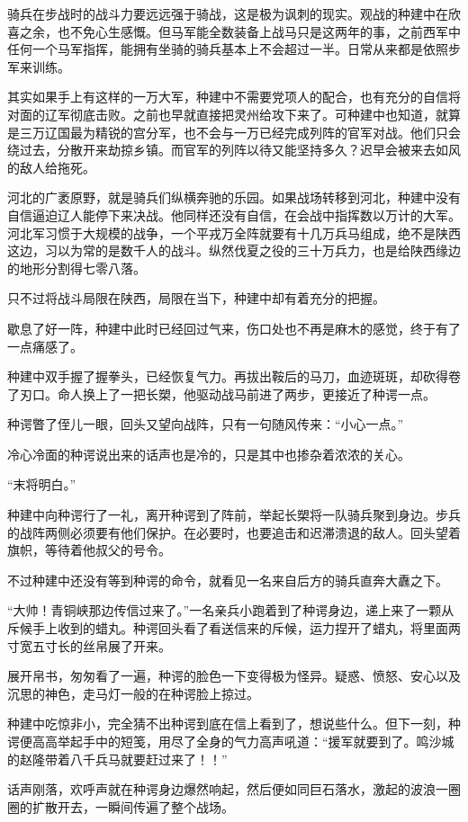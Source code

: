 骑兵在步战时的战斗力要远远强于骑战，这是极为讽刺的现实。观战的种建中在欣喜之余，也不免心生感慨。但马军能全数装备上战马只是这两年的事，之前西军中任何一个马军指挥，能拥有坐骑的骑兵基本上不会超过一半。日常从来都是依照步军来训练。

其实如果手上有这样的一万大军，种建中不需要党项人的配合，也有充分的自信将对面的辽军彻底击败。之前也早就直接把灵州给攻下来了。可种建中也知道，就算是三万辽国最为精锐的宫分军，也不会与一万已经完成列阵的官军对战。他们只会绕过去，分散开来劫掠乡镇。而官军的列阵以待又能坚持多久？迟早会被来去如风的敌人给拖死。

河北的广袤原野，就是骑兵们纵横奔驰的乐园。如果战场转移到河北，种建中没有自信逼迫辽人能停下来决战。他同样还没有自信，在会战中指挥数以万计的大军。河北军习惯于大规模的战争，一个平戎万全阵就要有十几万兵马组成，绝不是陕西这边，习以为常的是数千人的战斗。纵然伐夏之役的三十万兵力，也是给陕西缘边的地形分割得七零八落。

只不过将战斗局限在陕西，局限在当下，种建中却有着充分的把握。

歇息了好一阵，种建中此时已经回过气来，伤口处也不再是麻木的感觉，终于有了一点痛感了。

种建中双手握了握拳头，已经恢复气力。再拔出鞍后的马刀，血迹斑斑，却砍得卷了刃口。命人换上了一把长槊，他驱动战马前进了两步，更接近了种谔一点。

种谔瞥了侄儿一眼，回头又望向战阵，只有一句随风传来：“小心一点。”

冷心冷面的种谔说出来的话声也是冷的，只是其中也掺杂着浓浓的关心。

“末将明白。”

种建中向种谔行了一礼，离开种谔到了阵前，举起长槊将一队骑兵聚到身边。步兵的战阵两侧必须要有他们保护。在必要时，也要追击和迟滞溃退的敌人。回头望着旗帜，等待着他叔父的号令。

不过种建中还没有等到种谔的命令，就看见一名来自后方的骑兵直奔大纛之下。

“大帅！青铜峡那边传信过来了。”一名亲兵小跑着到了种谔身边，递上来了一颗从斥候手上收到的蜡丸。种谔回头看了看送信来的斥候，运力捏开了蜡丸，将里面两寸宽五寸长的丝帛展了开来。

展开帛书，匆匆看了一遍，种谔的脸色一下变得极为怪异。疑惑、愤怒、安心以及沉思的神色，走马灯一般的在种谔脸上掠过。

种建中吃惊非小，完全猜不出种谔到底在信上看到了，想说些什么。但下一刻，种谔便高高举起手中的短笺，用尽了全身的气力高声吼道：“援军就要到了。鸣沙城的赵隆带着八千兵马就要赶过来了！！”

话声刚落，欢呼声就在种谔身边爆然响起，然后便如同巨石落水，激起的波浪一圈圈的扩散开去，一瞬间传遍了整个战场。

